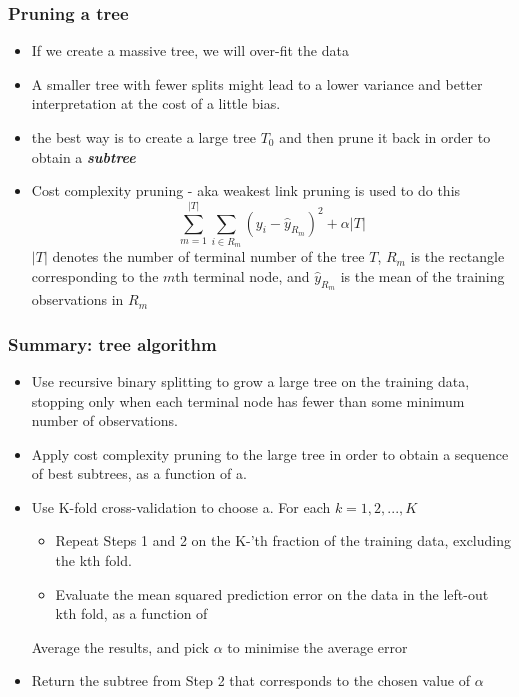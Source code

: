\documentclass{article}
\begin{document}
\subsubsection{Pruning a tree}
\begin{itemize}
    \item If we create a massive tree, we will over-fit the data 
    \item A smaller tree with fewer splits might lead to a lower variance and better interpretation at the cost of a little bias.
    \item the best way is to create a large tree $T_0$ and then prune it back in order to obtain a \textbf{\textit{subtree}}
    \item Cost complexity pruning - aka weakest link pruning is used to do this
    \begin{equation*}
        \sum_{m=1}^{|T|} \sum_{i\in R_m} (y_i - \hat{y}_{R_m})^2 + \alpha |T|
    \end{equation*}
    $|T|$ denotes the number of terminal number of the tree $T$, $R_m$ is the rectangle corresponding to the $m$th terminal node, and $\hat{y}_{R_m}$ is the mean of the training observations in $R_m$
\end{itemize}

\subsubsection{Summary: tree algorithm}
\begin{itemize}
    \item Use recursive binary splitting to grow a large tree on the training data, stopping only when each terminal node has fewer than some minimum number of observations.
    \item Apply cost complexity pruning to the large tree in order to obtain a sequence of best subtrees, as a function of a.
    \item Use K-fold cross-validation to choose a. For each $k = 1,2,..., K$
    \begin{itemize}
        \item Repeat Steps 1 and 2 on the K-'th fraction of the training data, excluding the kth fold.
        \item Evaluate the mean squared prediction error on the data in the left-out kth fold, as a function of
    \end{itemize}
    Average the results, and pick $\alpha$ to minimise the average error
    \item Return the subtree from Step 2 that corresponds to the chosen value of $\alpha$
\end{itemize}
\end{document}
